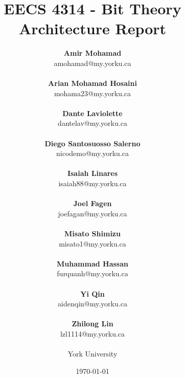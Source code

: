 \documentclass[12pt, dvipsnames, a4paper]{article}
\begin{document}
\title{\textbf{EECS 4314 - Bit Theory\\Architecture Report}}
\date{\Large \today}
\author{
	\large \textbf{Amir Mohamad}\\ \small amohamad@my.yorku.ca\\\\
	\large \textbf{Arian Mohamad Hosaini}\\ \small mohama23@my.yorku.ca\\\\
	\large \textbf{Dante Laviolette}\\ \small dantelav@my.yorku.ca\\\\
	\large \textbf{Diego Santosuosso Salerno}\\ \small nicodemo@my.yorku.ca\\\\
	\large \textbf{Isaiah Linares}\\ \small isaiah88@my.yorku.ca\\\\
	\large \textbf{Joel Fagen}\\ \small joefagan@my.yorku.ca\\\\
	\large \textbf{Misato Shimizu}\\ \small misato1@my.yorku.ca\\\\
	\large \textbf{Muhammad Hassan}\\ \small furquanh@my.yorku.ca\\\\
	\large \textbf{Yi Qin}\\ \small aidenqin@my.yorku.ca\\\\
	\large \textbf{Zhilong Lin}\\ \small lzl1114@my.yorku.ca\\\\
	\large York University\\
}
\maketitle
\newpage
\hspace{0pt}
\vfill
\end{document}
